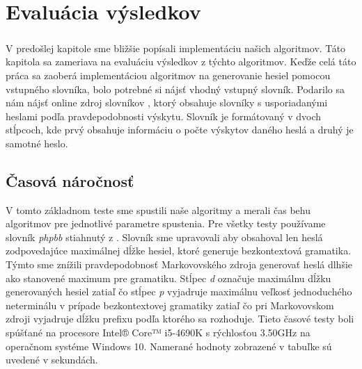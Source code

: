 \chapter{Evaluácia výsledkov}

\paragraph{}
V predošlej kapitole sme bližšie popísali implementáciu našich algoritmov. Táto kapitola sa zameriava na evaluáciu výsledkov z týchto algoritmov. Keďže celá táto práca sa zaoberá implementáciou algoritmov na generovanie hesiel pomocou vstupného slovníka, bolo potrebné si nájsť vhodný vstupný slovník. Podarilo sa nám nájsť online zdroj slovníkov \cite{dictionaries}, ktorý obsahuje slovníky s usporiadanými heslami podľa pravdepodobnosti výskytu. Slovník je formátovaný v dvoch stĺpcoch, kde prvý obsahuje informáciu o počte výskytov daného heslá a druhý je samotné heslo.

\section{Časová náročnosť}
\label{sec:time}
V tomto základnom teste sme spustili naše algoritmy a merali čas behu algoritmov pre jednotlivé parametre spustenia. Pre všetky testy používame slovník \emph{phpbb} stiahnutý z \cite{dictionaries}. Slovník sme upravovali aby obsahoval len heslá zodpovedajúce maximálnej dĺžke hesiel, ktoré generuje bezkontextová gramatika. Týmto sme znížili pravdepodobnosť Markovovského zdroja generovať heslá dlhšie ako stanovené maximum pre gramatiku. Stĺpec \emph{d} označuje maximálnu dĺžku generovaných hesiel zatiaľ čo stĺpec \emph{p} vyjadruje maximálnu veľkosť jednoduchého neterminálu v prípade bezkontextovej gramatiky zatiaľ čo pri Markovovskom zdroji vyjadruje dĺžku prefixu podľa ktorého sa rozhoduje. Tieto časové testy boli spúšťané na procesore Intel® Core™ i5-4690K s rýchlosťou 3.50GHz na operačnom systéme Windows 10. Namerané hodnoty zobrazené v tabuľke sú uvedené v sekundách.

